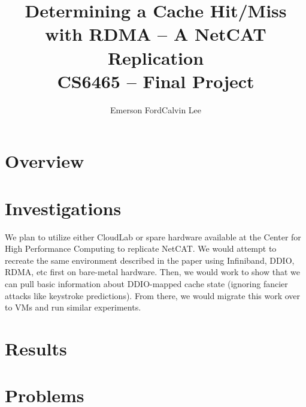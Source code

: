 \documentclass[11pt, twocolumn]{article}
\title{\Large\textbf{Determining a Cache Hit/Miss with RDMA -- A NetCAT Replication} \\
CS6465 -- Final Project}
\author{Emerson Ford\hspace{20pt}Calvin Lee}
\date{}
\begin{document}
\maketitle
\section{Overview}

\section{Investigations}
We plan to utilize either CloudLab or spare hardware available at the Center for High Performance Computing to replicate NetCAT.
We would attempt to recreate the same environment described in the paper using Infiniband, DDIO, RDMA, etc first on bare-metal hardware.
Then, we would work to show that we can pull basic information about DDIO-mapped cache state (ignoring fancier attacks like keystroke predictions).
From there, we would migrate this work over to VMs and run similar experiments.

\section{Results}

\section{Problems}
\end{document}
